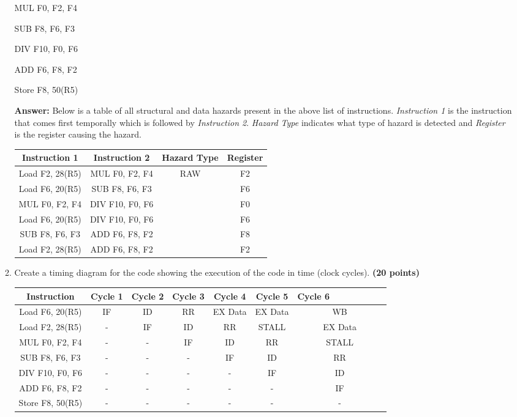 \documentclass[a4paper, 11pt]{exam}
\begin{document}
\begin{center}
\begin{enumerate}
\begin{enumerate}
\begin {center}
MUL F0, F2, F4

SUB F8, F6, F3

DIV F10, F0, F6

ADD F6, F8, F2

Store F8, 50(R5)

\end {center}

\hfill
 
\textbf{Answer:} Below is a table of all structural and data hazards present in the above list of instructions. \textit{Instruction 1} is the instruction that comes first temporally which is followed by \textit{Instruction 2}. \textit{Hazard Type} indicates what type of hazard is detected and \textit{Register} is the register causing the hazard.

\begin{center}
\begin{tabular}{ |c|c|c|c| } 
 \hline
  \textbf{Instruction 1} & \textbf{Instruction 2} & \textbf{Hazard Type} & \textbf{Register} \\ 
  \hline
 Load F2, 28(R5) & MUL F0, F2, F4 & RAW & F2\\ \hline
 Load F6, 20(R5) & SUB F8, F6, F3 & & F6\\ \hline
 MUL F0, F2, F4 & DIV F10, F0, F6 &  & F0 \\ \hline
 Load F6, 20(R5) & DIV F10, F0, F6 &  & F6 \\ \hline
 SUB F8, F6, F3 & ADD F6, F8, F2 & & F8\\ \hline
 Load F2, 28(R5) & ADD F6, F8, F2 & & F2\\ \hline
\end{tabular}
\end{center}

\hfill

\pagebreak
\item Create a timing diagram for the code showing the execution of the code in time (clock cycles). \textbf{(20 points)}

\begin{center}
\begin{tabular}{ |c|c|c|c|c|c|c| } 
 \hline
  \textbf{Instruction} & \textbf{Cycle 1} & \textbf{Cycle 2} & \textbf{Cycle 3} & \textbf{Cycle 4} & \textbf{Cycle 5} & 
  \textbf{Cycle 6 \ \ \ \ \ \ \ \ \ \ } \\ 
  \hline
 Load F6, 20(R5) & IF & ID & RR & EX Data & EX Data & WB\\ \hline
 Load F2, 28(R5) & - & IF & ID & RR & STALL & EX Data\\ \hline
 MUL F0, F2, F4 & - & - & IF & ID & RR & STALL\\ \hline
 SUB F8, F6, F3 & - & - & - & IF & ID & RR\\ \hline
 DIV F10, F0, F6 & - & - & - & - & IF & ID\\ \hline
 ADD F6, F8, F2 & - & - & - & - & - & IF\\ \hline
 Store F8, 50(R5) & - & - & - & - & - & -\\ \hline
\end{tabular}


\end{center}
\end{enumerate}
\end{enumerate}
\end{center}
\end{document}
